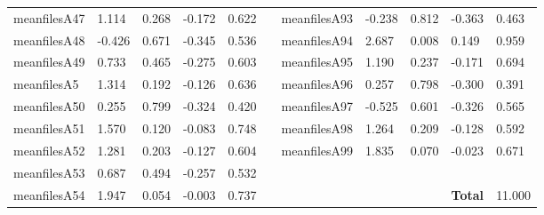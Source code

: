 \begin{table}[h!]
\begin{tabular}{lllllllllll}
meanfilesA47  & 1.114            & 0.268            & -0.172           & 0.622            &           & meanfilesA93  & -0.238           & 0.812            & -0.363           & 0.463            \\
meanfilesA48  & -0.426           & 0.671            & -0.345           & 0.536            &           & meanfilesA94  & 2.687            & 0.008            & 0.149            & 0.959            \\
meanfilesA49  & 0.733            & 0.465            & -0.275           & 0.603            &           & meanfilesA95  & 1.190            & 0.237            & -0.171           & 0.694            \\
meanfilesA5   & 1.314            & 0.192            & -0.126           & 0.636            &           & meanfilesA96  & 0.257            & 0.798            & -0.300           & 0.391            \\
meanfilesA50  & 0.255            & 0.799            & -0.324           & 0.420            &           & meanfilesA97  & -0.525           & 0.601            & -0.326           & 0.565            \\
meanfilesA51  & 1.570            & 0.120            & -0.083           & 0.748            &           & meanfilesA98  & 1.264            & 0.209            & -0.128           & 0.592            \\
meanfilesA52  & 1.281            & 0.203            & -0.127           & 0.604            &           & meanfilesA99  & 1.835            & 0.070            & -0.023           & 0.671            \\ \cline{7-11} 
meanfilesA53  & 0.687            & 0.494            & -0.257           & 0.532            &           &               &                  &                  &                  &                  \\
meanfilesA54  & 1.947            & 0.054            & -0.003           & 0.737            &           &               &                  &                  & \textbf{Total}   & 11.000          
\end{tabular}
\end{table}

